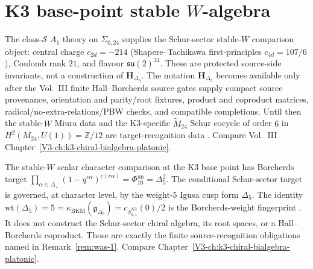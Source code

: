 \section{K3 base-point stable $W$-algebra}
\label{sec:was-supplement}

\begin{remark}
\label{rem:was-1}
The class-$\mathcal S$ $A_1$ theory on $\Sigma_{0,24}$ supplies the
Schur-sector stable-$W$ comparison object: central charge
$c_{2d} = -214$ (Shapere--Tachikawa first-principles
$c_{4d} = 107/6$), Coulomb rank $21$, and flavour
$\mathfrak{su}(2)^{24}$. These are protected source-side invariants,
not a construction of $\mathbf H_{\Delta_5}$. The notation
$\mathbf H_{\Delta_5}$ becomes available only after the Vol.~III finite
Hall--Borcherds source gates supply compact source provenance,
orientation and parity/root fixtures, product and coproduct matrices,
radical/no-extra-relations/PBW checks, and compatible completions. Until
then the stable-$W$ Miura data and the K3-specific
$\widetilde M_{24}$ Schur cocycle of order $6$ in
$H^2(M_{24}, U(1)) = \mathbb Z/12$ are target-recognition data
\cite{Gaiotto2009,BeemRastelli2015,ChengDuncanHarvey2014}. Compare
Vol.~III Chapter~\ref{V3-ch:k3-chiral-bialgebra-platonic}.
\end{remark}

\begin{remark}
\label{rem:was-2}
The stable-$W$ scalar character comparison at the K3 base point has
Borcherds target
$\prod_{\alpha\in\Delta_+}(1-q^{r\alpha})^{c(r\alpha)}
=\Phi_{10}^{\mathrm{un}}=\Delta_5^2$.
The conditional Schur-sector target is governed, at character level, by
the weight-$5$ Igusa cusp form $\Delta_5$. The identity
$\mathrm{wt}(\Delta_5)=5=\kappa_{\mathrm{BKM}}(\mathfrak g_{\Delta_5})
=c_{\phi_{0,1}^{K3}}(0)/2$ is the Borcherds-weight fingerprint
\cite{Borcherds1992,Gritsenko1999}. It does not construct the
Schur-sector chiral algebra, its root spaces, or a Hall--Borcherds
coproduct. Those are exactly the finite source-recognition obligations
named in Remark~\ref{rem:was-1}. Compare
Chapter~\ref{V3-ch:k3-chiral-bialgebra-platonic}.
\end{remark}

